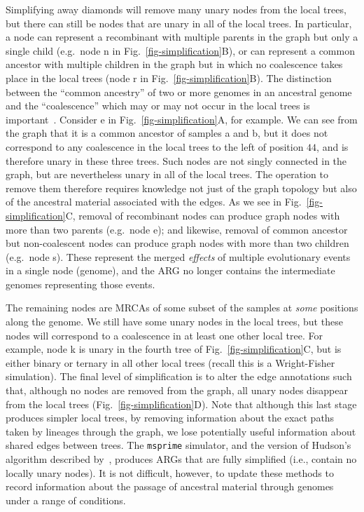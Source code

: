 \documentclass{article}
\newcommand{\noderef}[1]{\textsf{#1}}
\begin{document}
Simplifying away diamonds will remove many unary nodes from the
local trees, but there can still be nodes that are unary in all
of the local trees. In particular, a node can represent a recombinant
with multiple parents in the graph but only a single child (e.g.\ node \noderef{n}
in Fig.~\ref{fig-simplification}B), or can represent a common ancestor with
multiple children in the graph but in which no coalescence takes place
in the local trees
(node \noderef{r} in Fig.~\ref{fig-simplification}B).
The distinction between the ``common ancestry'' of two or more genomes
in an ancestral genome and the ``coalescence'' which may or may
not occur in the local trees is
important~\citep{hudson1983testing,kelleher2016efficient}.
Consider \noderef{e} in Fig.~\ref{fig-simplification}A,
for example. We can see from the graph that it is a common
ancestor of samples \noderef{a} and \noderef{b}, but
it does not correspond to any coalescence in the
local trees to the left of position $44$, and is therefore
unary in these three trees.
Such nodes are not singly connected in the graph, but are nevertheless unary in
all of the local trees.
The operation to remove them
therefore requires knowledge not just of the graph topology but also of the
ancestral material associated with the edges.
As we see in Fig.~\ref{fig-simplification}C,
removal of recombinant nodes can produce graph nodes with
more than two parents (e.g.~node \noderef{e}); and likewise, removal of
common ancestor but non-coalescent nodes can produce graph nodes with
more than two children (e.g.~node \noderef{s}). These represent the
merged
\emph{effects} of multiple evolutionary events in a single node (genome), and the
ARG no longer contains the intermediate genomes representing those events.

The remaining nodes are MRCAs of some subset of the samples
at \emph{some} positions along the genome. We still have
some unary nodes in the local trees, but these nodes will
correspond to a coalescence in at least one other
local tree. For example, node  \noderef{k} is unary in the fourth tree
of Fig.~\ref{fig-simplification}C, but is either binary
or ternary in all other local trees (recall this is a Wright-Fisher
simulation). The final level of simplification is to alter the edge annotations
such that, although no nodes are removed from the graph, all
unary nodes disappear from the local trees (Fig.~\ref{fig-simplification}D).
Note that although this last stage produces simpler local trees, by
removing information about the exact paths taken by lineages through
the graph, we lose potentially useful information about shared edges
between trees.
The \texttt{msprime} simulator, and the version of Hudson's algorithm described
by~\citet{kelleher2016efficient}, produces ARGs
that are fully simplified (i.e., contain no locally unary nodes).
It is not difficult, however, to update
these methods to record information about the passage of ancestral
material through genomes under a range of conditions.
\end{document}
